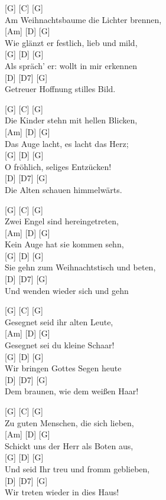 \documentclass[
  letterpaper,
]{scrbook}
\begin{document}
{[}G{]} {[}C{]} {[}G{]}\\
Am Weihnachtsbaume die Lichter brennen,\\
{[}Am{]} {[}D{]} {[}G{]}\\
Wie glänzt er festlich, lieb und mild,\\
{[}G{]} {[}D{]} {[}G{]}\\
Als spräch' er: wollt in mir erkennen\\
{[}D{]} {[}D7{]} {[}G{]}\\
Getreuer Hoffnung stilles Bild.

{[}G{]} {[}C{]} {[}G{]}\\
Die Kinder stehn mit hellen Blicken,\\
{[}Am{]} {[}D{]} {[}G{]}\\
Das Auge lacht, es lacht das Herz;\\
{[}G{]} {[}D{]} {[}G{]}\\
O fröhlich, seliges Entzücken!\\
{[}D{]} {[}D7{]} {[}G{]}\\
Die Alten schauen himmelwärts.

{[}G{]} {[}C{]} {[}G{]}\\
Zwei Engel sind hereingetreten,\\
{[}Am{]} {[}D{]} {[}G{]}\\
Kein Auge hat sie kommen sehn,\\
{[}G{]} {[}D{]} {[}G{]}\\
Sie gehn zum Weihnachtstisch und beten,\\
{[}D{]} {[}D7{]} {[}G{]}\\
Und wenden wieder sich und gehn

{[}G{]} {[}C{]} {[}G{]}\\
Gesegnet seid ihr alten Leute,\\
{[}Am{]} {[}D{]} {[}G{]}\\
Gesegnet sei du kleine Schaar!\\
{[}G{]} {[}D{]} {[}G{]}\\
Wir bringen Gottes Segen heute\\
{[}D{]} {[}D7{]} {[}G{]}\\
Dem braunen, wie dem weißen Haar!

{[}G{]} {[}C{]} {[}G{]}\\
Zu guten Menschen, die sich lieben,\\
{[}Am{]} {[}D{]} {[}G{]}\\
Schickt uns der Herr als Boten aus,\\
{[}G{]} {[}D{]} {[}G{]}\\
Und seid Ihr treu und fromm geblieben,\\
{[}D{]} {[}D7{]} {[}G{]}\\
Wir treten wieder in dies Haus!
\end{document}
